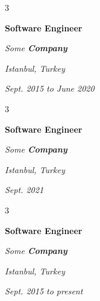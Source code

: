 \documentclass[10pt, letterpaper]{article}
\newenvironment{threecolentry}[3][]{
    \onecolentry
    \def\thirdColumn{#3}
    \setcolumnwidth{0.6 cm, \fill, 4.5 cm}
    \begin{paracol}{3}
    #2 \switchcolumn
}{
    \switchcolumn \raggedleft \thirdColumn
    \end{paracol}
    \endonecolentry
} %
\begin{document}
        \vspace{0.2 cm-3px}

        \begin{threecolentry}{
            \vspace*{\fill}
            \textbullet
            \vspace*{3px}
            \vspace*{\fill}
        }{
        \textit{Istanbul, Turkey}    
            
        \textit{Sept. 2015 to June 2020}}
            \textbf{Software Engineer}
            
            \textit{Some \textbf{Company}}
        \end{threecolentry}



        \vspace{0.2 cm-3px}

        \begin{threecolentry}{
            \vspace*{\fill}
            \textbullet
            \vspace*{3px}
            \vspace*{\fill}
        }{
        \textit{Istanbul, Turkey}    
            
        \textit{Sept. 2021}}
            \textbf{Software Engineer}
            
            \textit{Some \textbf{Company}}
        \end{threecolentry}



        \vspace{0.2 cm-3px}

        \begin{threecolentry}{
            \vspace*{\fill}
            \textbullet
            \vspace*{3px}
            \vspace*{\fill}
        }{
        \textit{Istanbul, Turkey}    
            
        \textit{Sept. 2015 to present}}
            \textbf{Software Engineer}
            
            \textit{Some \textbf{Company}}
        \end{threecolentry}
\end{document}
